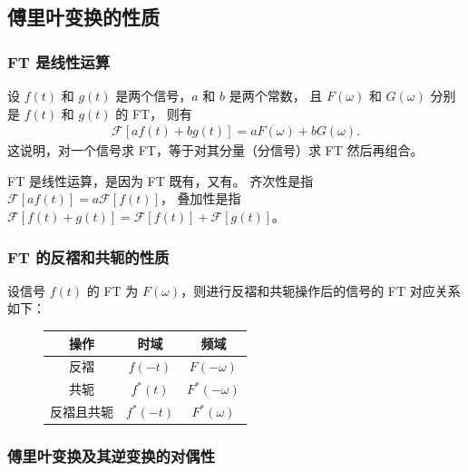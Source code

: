 \subsection{傅里叶变换的性质}

\subsubsection{FT 是线性运算}

\begin{property}
    设 $f(t)$ 和 $g(t)$ 是两个信号，$a$ 和 $b$ 是两个常数，
    且 $F(\omega)$ 和 $G(\omega)$ 分别是 $f(t)$ 和 $g(t)$ 的 FT，
    则有
    \begin{align*}
        \mathcal{F}[af(t) + bg(t)] = aF(\omega) + bG(\omega).
    \end{align*}
    这说明，对一个信号求 FT，等于对其分量（分信号）求 FT 然后再组合。
\end{property}

\begin{remark}
    FT 是线性运算，是因为 FT 既有，又有。
    齐次性是指 $\mathcal{F}[af(t)] = a\mathcal{F}[f(t)]$，
    叠加性是指 $\mathcal{F}[f(t) + g(t)] = \mathcal{F}[f(t)] + \mathcal{F}[g(t)]$。
\end{remark}

\subsubsection{FT 的反褶和共轭的性质}

\begin{property}
    设信号 $f(t)$ 的 FT 为 $F(\omega)$，则进行反褶和共轭操作后的信号的 FT 对应关系如下：
    \begin{figure}[H]
        \begin{tabular}
            {c||c|c}
            操作 & 时域 & 频域 \\
            \hline
            反褶 & $f(-t)$ & $F(-\omega)$ \\
            共轭 & $f^*(t)$ & $F^*(-\omega)$ \\
            反褶且共轭 & $f^*(-t)$ & $F^*(\omega)$ \\
        \end{tabular}
    \end{figure}
\end{property}

\subsubsection{傅里叶变换及其逆变换的对偶性}


